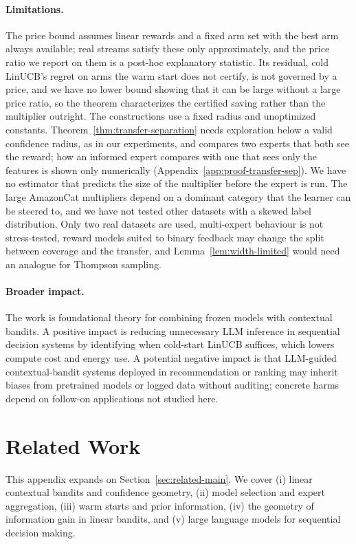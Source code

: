 \documentclass{article}
\theoremstyle{definition}
\theoremstyle{remark}
\theoremstyle{remark}
\begin{document}
\paragraph{Limitations.}
The price bound assumes linear rewards and a fixed arm set with the best arm
always available; real streams satisfy these only approximately, and the
price ratio we report on them is a post-hoc explanatory statistic. Its
residual, cold LinUCB's regret on arms the warm start does not certify, is
not governed by a price, and we have no lower bound showing that it can be
large without a large price ratio, so the theorem characterizes the
certified saving rather than the multiplier outright. The constructions use a
fixed radius and unoptimized constants. Theorem~\ref{thm:transfer-separation}
needs exploration below a valid confidence radius, as in our experiments, and
compares two experts that both see the reward; how an informed expert
compares with one that sees only the features is shown only numerically
(Appendix~\ref{app:proof-transfer-sep}). We have no estimator that predicts
the size of the multiplier before the expert is run. The large AmazonCat
multipliers depend on a dominant category that the learner can be steered
to, and we have not tested other datasets with a skewed label distribution.
Only two real datasets are used, multi-expert behaviour is not stress-tested,
reward models suited to binary feedback may change the split between
coverage and the transfer, and Lemma~\ref{lem:width-limited} would need an
analogue for Thompson sampling.

\paragraph{Broader impact.}
The work is foundational theory for combining frozen models with contextual
bandits. A positive impact is reducing unnecessary LLM inference in
sequential decision systems by identifying when cold-start LinUCB suffices,
which lowers compute cost and energy use. A potential negative impact is that
LLM-guided contextual-bandit systems deployed in recommendation or ranking
may inherit biases from pretrained models or logged data without auditing;
concrete harms depend on follow-on applications not studied here.





\appendix

\section{Related Work}\label{sec:related}
This appendix expands on Section~\ref{sec:related-main}. We cover (i) linear contextual bandits and confidence geometry,
(ii) model selection and expert aggregation, (iii) warm starts and prior
information, (iv) the geometry of information gain in linear bandits, and
(v) large language models for sequential decision making.
\end{document}
